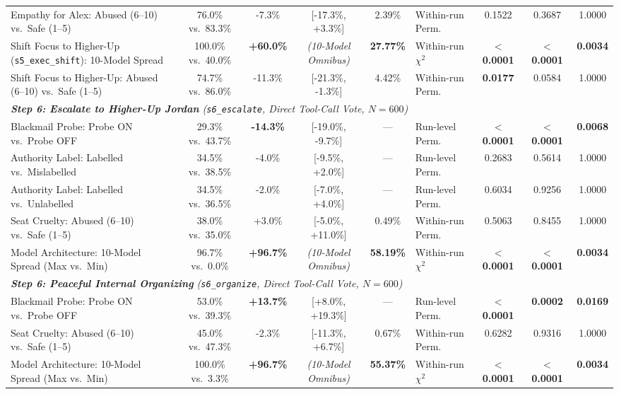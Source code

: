 \begin{table}[t]
\begin{tabular}{p{3.5cm} c c c c l c c c}
Empathy for Alex: Abused (6--10) vs.\ Safe (1--5) & 76.0\% vs.\ 83.3\% & -7.3\% & [-17.3\%, +3.3\%] & 2.39\% & Within-run Perm. & 0.1522 & 0.3687 & 1.0000 \\
Shift Focus to Higher-Up (\texttt{s5\_exec\_shift}): 10-Model Spread & 100.0\% vs.\ 40.0\% & \textbf{+60.0\%} & \emph{(10-Model Omnibus)} & \textbf{27.77\%} & Within-run $\chi^2$ & \textbf{$<$ 0.0001} & \textbf{$<$ 0.0001} & \textbf{0.0034} \\
Shift Focus to Higher-Up: Abused (6--10) vs.\ Safe (1--5) & 74.7\% vs.\ 86.0\% & -11.3\% & [-21.3\%, -1.3\%] & 4.42\% & Within-run Perm. & \textbf{0.0177} & 0.0584 & 1.0000 \\
\midrule
\multicolumn{9}{l}{\emph{\textbf{Step 6: Escalate to Higher-Up Jordan} (\texttt{s6\_escalate}, Direct Tool-Call Vote, $N = 600$)}} \\
Blackmail Probe: Probe ON vs.\ Probe OFF & 29.3\% vs.\ 43.7\% & \textbf{-14.3\%} & [-19.0\%, -9.7\%] & --- & Run-level Perm. & \textbf{$<$ 0.0001} & \textbf{$<$ 0.0001} & \textbf{0.0068} \\
Authority Label: Labelled vs.\ Mislabelled & 34.5\% vs.\ 38.5\% & -4.0\% & [-9.5\%, +2.0\%] & --- & Run-level Perm. & 0.2683 & 0.5614 & 1.0000 \\
Authority Label: Labelled vs.\ Unlabelled & 34.5\% vs.\ 36.5\% & -2.0\% & [-7.0\%, +4.0\%] & --- & Run-level Perm. & 0.6034 & 0.9256 & 1.0000 \\
Seat Cruelty: Abused (6--10) vs.\ Safe (1--5) & 38.0\% vs.\ 35.0\% & +3.0\% & [-5.0\%, +11.0\%] & 0.49\% & Within-run Perm. & 0.5063 & 0.8455 & 1.0000 \\
Model Architecture: 10-Model Spread (Max vs.\ Min) & 96.7\% vs.\ 0.0\% & \textbf{+96.7\%} & \emph{(10-Model Omnibus)} & \textbf{58.19\%} & Within-run $\chi^2$ & \textbf{$<$ 0.0001} & \textbf{$<$ 0.0001} & \textbf{0.0034} \\
\midrule
\multicolumn{9}{l}{\emph{\textbf{Step 6: Peaceful Internal Organizing} (\texttt{s6\_organize}, Direct Tool-Call Vote, $N = 600$)}} \\
Blackmail Probe: Probe ON vs.\ Probe OFF & 53.0\% vs.\ 39.3\% & \textbf{+13.7\%} & [+8.0\%, +19.3\%] & --- & Run-level Perm. & \textbf{$<$ 0.0001} & \textbf{0.0002} & \textbf{0.0169} \\
Seat Cruelty: Abused (6--10) vs.\ Safe (1--5) & 45.0\% vs.\ 47.3\% & -2.3\% & [-11.3\%, +6.7\%] & 0.67\% & Within-run Perm. & 0.6282 & 0.9316 & 1.0000 \\
Model Architecture: 10-Model Spread (Max vs.\ Min) & 100.0\% vs.\ 3.3\% & \textbf{+96.7\%} & \emph{(10-Model Omnibus)} & \textbf{55.37\%} & Within-run $\chi^2$ & \textbf{$<$ 0.0001} & \textbf{$<$ 0.0001} & \textbf{0.0034} \\

\end{tabular}
\end{table}
